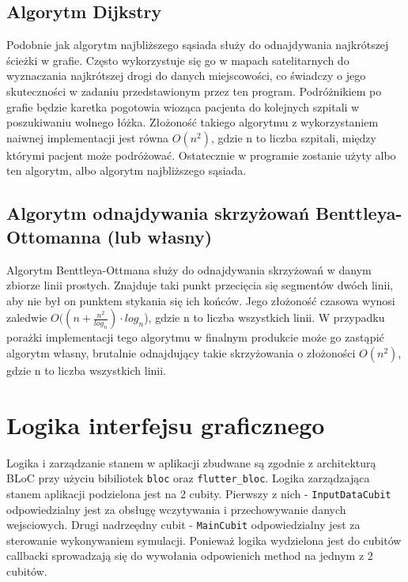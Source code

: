 \documentclass{article}
\newcommand\tab[1][1cm]{\hspace*{#1}}
\begin{document}
\subsection{Algorytm Dijkstry}
\tab Podobnie jak algorytm najbliższego sąsiada służy do odnajdywania najkrótszej ścieżki w grafie. Często wykorzystuje się go w mapach satelitarnych do wyznaczania najkrótszej drogi do danych miejscowości, co świadczy o jego skuteczności w zadaniu przedstawionym przez ten program.
\tab Podróżnikiem po grafie będzie karetka pogotowia wioząca pacjenta do kolejnych szpitali w poszukiwaniu wolnego łóżka. Złożoność takiego algorytmu z wykorzystaniem naiwnej implementacji jest równa $O(n^2)$, gdzie n to liczba szpitali, między którymi pacjent może podróżować.
\newline \tab Ostatecznie w programie zostanie użyty albo ten algorytm, albo algorytm najbliższego sąsiada.

\subsection{Algorytm odnajdywania skrzyżowań Benttleya-Ottomanna (lub własny)}
\tab Algorytm Benttleya-Ottmana służy do odnajdywania skrzyżowań w danym zbiorze linii prostych. Znajduje taki punkt przecięcia się segmentów dwóch linii, aby nie był on punktem stykania się ich końców. Jego złożoność czasowa wynosi zaledwie $O((n + \frac{n^2}{log_n}) \cdot log_n$), gdzie n to liczba wszystkich linii. 
\newline \tab W przypadku porażki implementacji tego algorytmu w finalnym produkcie może go zastąpić algorytm własny, brutalnie odnajdujący takie skrzyżowania o złożoności $O(n^2)$, gdzie n to liczba wszystkich linii.

\newpage
\section{Logika interfejsu graficznego}
Logika i zarządzanie stanem w aplikacji zbudwane są zgodnie z architekturą BLoC przy użyciu bibiliotek \texttt{bloc} oraz \texttt{flutter\_bloc}. Logika zarządzająca stanem aplikacji podzielona jest na 2 cubity. Pierwszy z nich - \texttt{InputDataCubit} odpowiedzialny jest za obsługę wczytywania i przechowywanie danych wejsciowych. Drugi nadrzeędny cubit - \texttt{MainCubit} odpowiedzialny jest za sterowanie wykonywaniem symulacji. Ponieważ logika wydzielona jest do cubitów callbacki sprowadzają się do wywołania odpowienich method na jednym z 2 cubitów.
\end{document}
